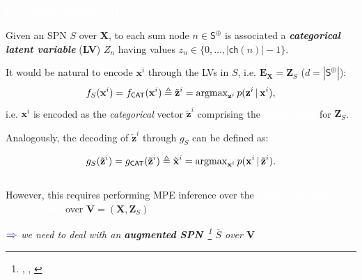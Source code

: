 \documentclass[xcolor={usenames,dvipsnames,svgnames}, compress]{beamer}
\newcommand{\argmax}{\operatornamewithlimits{argmax}}
\newcommand{\nodeset}[1]{\bm{\mathsf{#1}}}
\newcommand{\cbar}{\,|\,}
\newcommand{\highlighttext}[2][yellow]{{\colorbox{#1}{\textcolor{white}{#2}}}}
\newcommand{\customcite}[1]{\footnote{\tiny \citeauthor{#1}, \citetitle{#1}, \citeyear{#1}}}
\begin{document}
   

\begin{frame}[t]
    \frametitle{\highlighttext[bgrey1]{$\mathsf{CAT}$ embeddings (I)}}
    \footnotesize

    Given an SPN $S$ over $\mathbf{X}$,  to each sum node
    $n\in\nodeset{S}^{\oplus}$ is associated a \emph{\textbf{categorical latent
    variable}} (\textbf{LV}) $Z_{n}$
    having values $z_{n}\in\{0,\dots,|\mathsf{ch}(n)|-1\}$.\par\bigskip

    It would be natural to encode $\mathbf{x}^{i}$ through
    the  LVs in $S$,
    i.e. $\mathbf{E}_{\mathbf{X}}=\mathbf{Z}_{S}$ ($d=|\nodeset{S}^{\oplus}|$):
\begin{equation}
  \label{eq:lv-enc}
  f_{S}(\mathbf{x}^{i}) 
  = f_{\mathsf{CAT}}(\mathbf{x}^{i}) \triangleq \tilde{\mathbf{z}}^{i} = \argmax\nolimits_{\mathbf{z}^i}p(\mathbf{z}^i \cbar \mathbf{x}^{i}),
\end{equation}
i.e. $\mathbf{x}^{i}$ is encoded as the \emph{categorical} vector
$\tilde{\mathbf{z}}^{i}$ %
comprising the \highlighttext[tomato0]{\emph{\textbf{MPE state}}} for $\mathbf{Z}_{S}$.\par\bigskip

Analogously, the decoding of $\tilde{\mathbf{z}}^{i}$
 through $g_{S}$ can be defined as:

\begin{equation}
  \label{eq:lv-dec}
  g_{S}(\tilde{\mathbf{z}}^{i}) 
  = g_{\mathsf{CAT}}(\tilde{\mathbf{z}}^{i}) \triangleq \tilde{\mathbf{x}}^{i} = \argmax\nolimits_{\mathbf{x}^i} p(\mathbf{x}^i \cbar \tilde{\mathbf{z}}^{i}).
\end{equation}\\[10pt]

However, this requires performing MPE inference over the \highlighttext[tomato0]{\emph{\textbf{joint
probability distribution}}} over $\mathbf{V}=(\mathbf{X}, \mathbf{Z}_{S})$

\begin{minipage}{1.0\linewidth}
      \raggedleft
      $\color{violet}\boldsymbol\Rightarrow$
      \scriptsize
     \emph{we need to deal with an \emph{\textbf{augmented
           SPN}}~\customcite{Peharz2016} $\overline{S}$ over $\mathbf{V}$}
\end{minipage}
\end{frame}
\end{document}
